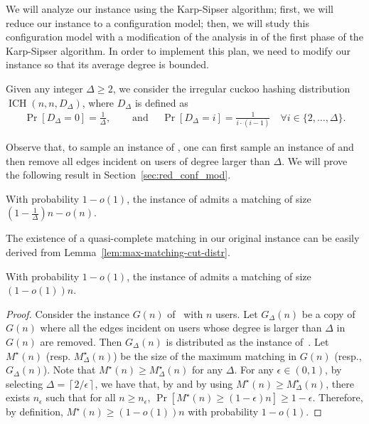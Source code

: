 \documentclass[11pt]{article}
\DeclareMathOperator*{\irregularcuckoohashing}{ICH}
\begin{document}
We will analyze our instance using the Karp-Sipser algorithm; first, we will reduce our instance to a configuration model; then, we will study this configuration model with a modification of the analysis in \cite{bg15} of the first phase of the Karp-Sipser algorithm. In order to implement this plan, we need to modify our instance so that its average degree is bounded.
\begin{definition}\label{def:modified-instance}
Given any integer $\Delta \geq 2$, we consider the irregular cuckoo hashing distribution $\irregularcuckoohashing(n, n, D_{\Delta})$, where $D_\Delta$ is defined as
\begin{align*}
\Pr[D_\Delta = 0]  = \frac{1}{\Delta}, &\quad \text{ and } \quad
\Pr[D_\Delta = i]  = \frac{1}{i\cdot(i-1)} \quad \forall i \in \{2,\dots, \Delta\}.
\end{align*}
\end{definition}
Observe that, to sample an instance of , one can first sample an instance of  and then remove all edges incident on users of degree larger than $\Delta$. We will prove the following result in Section~\ref{sec:red_conf_mod}.
\begin{lemma}\label{lem:max-matching-cut-distr}
With probability $1-o(1)$, the instance of  admits a matching of size $\left(1 - \frac{1}{\Delta}\right)n - o(n)$.
\end{lemma}
The existence of a quasi-complete matching in our original instance can be easily derived from Lemma~\ref{lem:max-matching-cut-distr}. \begin{theoremrep}\label{thm:mm}
With probability $1-o(1)$, the instance of  admits a matching of size $(1-o(1))n$.
\end{theoremrep}
\begin{proof}
Consider the instance $G(n)$ of~ with $n$ users. Let $G_{\Delta}(n)$ be a copy of $G(n)$ where all the edges incident on users whose degree is larger than $\Delta$ in $G(n)$ are removed. Then $G_{\Delta}(n)$ is distributed as the instance of~. Let $M^{\star}(n)$ (resp. $M_{\Delta}^{\star}(n)$) be the size of the maximum matching in $G(n)$ (resp., $G_{\Delta}(n)$). Note that $M^{\star}(n) \geq M_{\Delta}^{\star}(n)$ for any $\Delta$. For any $\epsilon \in (0,1)$, by selecting $\Delta = \left\lceil 2/\epsilon \right\rceil$, we have that, by  and by using $M^{\star}(n) \geq M_{\Delta}^{\star}(n)$, there exists $n_\epsilon$ such that for all $n \geq n_\epsilon$, $\Pr\left[M^{\star}(n) \geq (1-\epsilon)n\right] \geq 1 - \epsilon$. Therefore, by definition, $M^{\star}(n) \geq (1-o(1))n$ with probability $1-o(1)$.
\end{proof}
\end{document}
